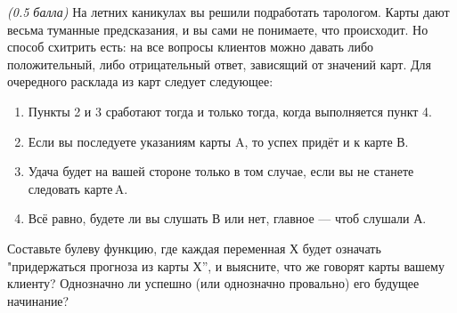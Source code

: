 \question
\textit{(0.5 балла)} На летних каникулах вы решили подработать тарологом. Карты дают весьма туманные предсказания, и вы сами не понимаете, что происходит. Но способ схитрить есть: на все вопросы клиентов можно давать либо положительный, либо отрицательный ответ, зависящий от значений карт. Для очередного расклада из карт следует следующее:

\begin{enumerate}
    \item Пункты 2 и 3 сработают тогда и только тогда, когда выполняется пункт 4.
    \item Если вы последуете указаниям карты A, то успех придёт и к карте В.
    \item Удача будет на вашей стороне только в том случае, если вы не станете следовать карте A.
    \item Всё равно, будете ли вы слушать В или нет, главное — чтоб слушали А.
\end{enumerate}

Составьте булеву функцию, где каждая переменная Х будет означать "придержаться прогноза из карты Х”, и выясните, что же говорят карты вашему клиенту? Однозначно ли успешно (или однозначно провально) его будущее начинание?